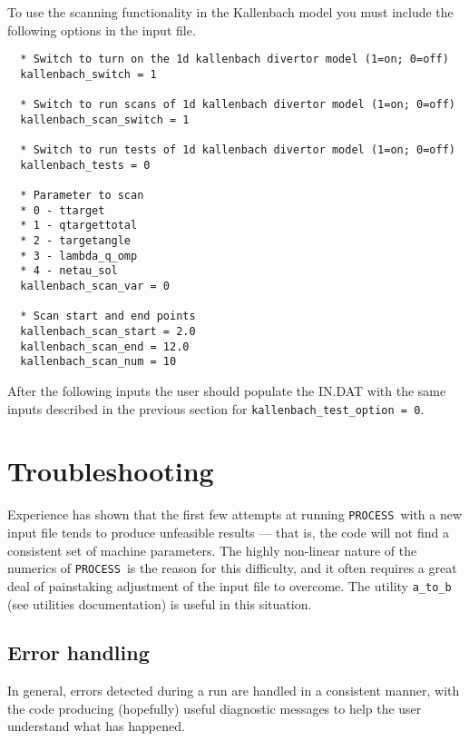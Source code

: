 \documentclass[11pt,a4paper]{report}
\newcommand{\process}{\mbox{\texttt{PROCESS}}}
\begin{document}
To use the scanning functionality in the Kallenbach model you must include the 
following options in the input file.

\begin{mdframed}
\begin{verbatim}
  * Switch to turn on the 1d kallenbach divertor model (1=on; 0=off)
  kallenbach_switch = 1

  * Switch to run scans of 1d kallenbach divertor model (1=on; 0=off)
  kallenbach_scan_switch = 1

  * Switch to run tests of 1d kallenbach divertor model (1=on; 0=off)
  kallenbach_tests = 0

  * Parameter to scan
  * 0 - ttarget
  * 1 - qtargettotal
  * 2 - targetangle
  * 3 - lambda_q_omp
  * 4 - netau_sol
  kallenbach_scan_var = 0

  * Scan start and end points
  kallenbach_scan_start = 2.0
  kallenbach_scan_end = 12.0
  kallenbach_scan_num = 10

\end{verbatim}
\end{mdframed}

After the following inputs the user should populate the IN.DAT with the same 
inputs described in the previous section for 
\texttt{kallenbach\_test\_option = 0}.

\section{Troubleshooting}
\label{sec:problems}

Experience has shown that the first few attempts at running \process\ with a
new input file tends to produce unfeasible results --- that is, the code will
not find a consistent set of machine parameters. The highly non-linear nature
of the numerics of \process\ is the reason for this difficulty, and it often
requires a great deal of painstaking adjustment of the input file to overcome.  The utility
\texttt{a\_to\_b} (see utilities documentation) is useful in this situation.

\subsection{Error handling}
\label{sec:errors}

In general, errors detected during a run are handled in a consistent manner,
with the code producing (hopefully) useful diagnostic messages to help the
user understand what has happened.
\end{document}
